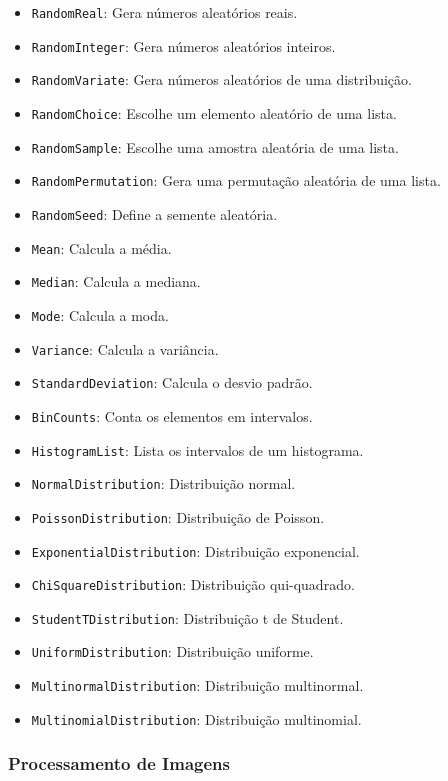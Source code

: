 \documentclass[a4paper, 12pt]{article}
\begin{document}
\begin{itemize}
    \item \texttt{RandomReal}: Gera números aleatórios reais.
    \item \texttt{RandomInteger}: Gera números aleatórios inteiros.
    \item \texttt{RandomVariate}: Gera números aleatórios de uma distribuição.
    \item \texttt{RandomChoice}: Escolhe um elemento aleatório de uma lista.
    \item \texttt{RandomSample}: Escolhe uma amostra aleatória de uma lista.
    \item \texttt{RandomPermutation}: Gera uma permutação aleatória de uma lista.
    \item \texttt{RandomSeed}: Define a semente aleatória.
    \item \texttt{Mean}: Calcula a média.

    \item \texttt{Median}: Calcula a mediana.
    \item \texttt{Mode}: Calcula a moda.
    \item \texttt{Variance}: Calcula a variância.
    \item \texttt{StandardDeviation}: Calcula o desvio padrão.
    \item \texttt{BinCounts}: Conta os elementos em intervalos.
    \item \texttt{HistogramList}: Lista os intervalos de um histograma.
    \item \texttt{NormalDistribution}: Distribuição normal.
    \item \texttt{PoissonDistribution}: Distribuição de Poisson.
    \item \texttt{ExponentialDistribution}: Distribuição exponencial.
    \item \texttt{ChiSquareDistribution}: Distribuição qui-quadrado.
    \item \texttt{StudentTDistribution}: Distribuição t de Student.
    \item \texttt{UniformDistribution}: Distribuição uniforme.
    \item \texttt{MultinormalDistribution}: Distribuição multinormal.
    \item \texttt{MultinomialDistribution}: Distribuição multinomial.
\end{itemize}

\subsubsection{Processamento de Imagens}\label{processamento-de-imagens}
\end{document}
